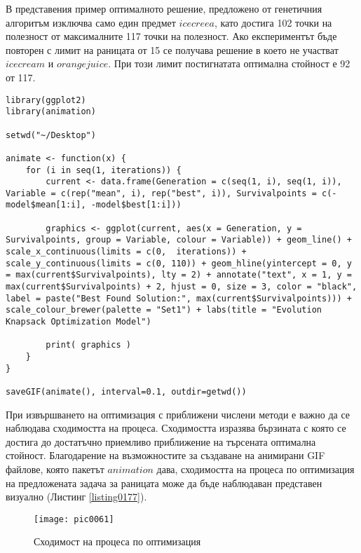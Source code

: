 В представения пример оптималното решение, предложено от генетичния алгоритъм изключва само един предмет $ice creea$, като достига 102 точки на полезност от максималните 117 точки на полезност. Ако експериментът бъде повторен с лимит на раницата от 15 се получава решение в което не участват $ice cream$ и $orange juice$. При този лимит постигнатата оптимална стойност е 92 от 117. 

\begin{lstlisting}[caption=Анимирана визуализация на процеса по търсене на оптимално решение, label=listing0177]
library(ggplot2)
library(animation)

setwd("~/Desktop")

animate <- function(x) {
	for (i in seq(1, iterations)) {
		current <- data.frame(Generation = c(seq(1, i), seq(1, i)), Variable = c(rep("mean", i), rep("best", i)), Survivalpoints = c(-model$mean[1:i], -model$best[1:i]))

		graphics <- ggplot(current, aes(x = Generation, y = Survivalpoints, group = Variable, colour = Variable)) + geom_line() + scale_x_continuous(limits = c(0,  iterations)) + scale_y_continuous(limits = c(0, 110)) + geom_hline(yintercept = 0, y = max(current$Survivalpoints), lty = 2) + annotate("text", x = 1, y = max(current$Survivalpoints) + 2, hjust = 0, size = 3, color = "black", label = paste("Best Found Solution:", max(current$Survivalpoints))) + scale_colour_brewer(palette = "Set1") + labs(title = "Evolution Knapsack Optimization Model")

		print( graphics )
    }
}

saveGIF(animate(), interval=0.1, outdir=getwd())
\end{lstlisting}

При извършването на оптимизация с приближени числени методи е важно да се наблюдава сходимостта на процеса. Сходимостта изразява бързината с която се достига до достатъчно приемливо приближение на търсената оптимална стойност. Благодарение на възможностите за създаване на анимирани GIF файлове, която пакетът $animation$ дава, сходимостта на процеса по оптимизация на предложената задача за раницата може да бъде наблюдаван представен визуално (Листинг \ref{listing0177}).

\begin{figure}[h!]
  \centering
  \texttt{[image: pic0061]}
  \caption{Сходимост на процеса по оптимизация}
\label{figure0061}
\end{figure}
\FloatBarrier

